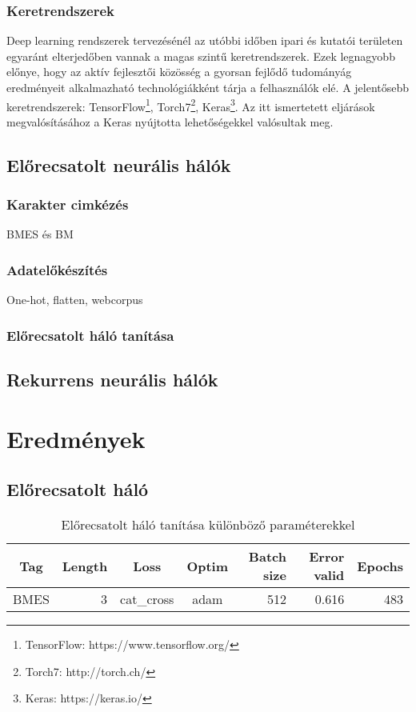 \documentclass[a4paper, magyar]{article}
\begin{document}
\subsubsection{Keretrendszerek}
Deep learning rendszerek tervezésénél az utóbbi időben ipari és kutatói területen egyaránt elterjedőben vannak a magas szintű keretrendszerek. Ezek legnagyobb előnye, hogy az aktív fejlesztői közösség a gyorsan fejlődő tudományág eredményeit alkalmazható technológiákként tárja a felhasználók elé. A jelentősebb keretrendszerek: TensorFlow\footnote{TensorFlow: https://www.tensorflow.org/}, Torch7\footnote{Torch7: http://torch.ch/}, Keras\footnote{Keras: https://keras.io/}. Az itt ismertetett eljárások megvalósításához a Keras nyújtotta lehetőségekkel valósultak meg\cite{chollet2015keras}. 
\subsection{Előrecsatolt neurális hálók}
\subsubsection{Karakter cimkézés}
BMES és BM
\subsubsection{Adatelőkészítés}
One-hot, flatten, webcorpus
\subsubsection{Előrecsatolt háló tanítása}
\subsection{Rekurrens neurális hálók}
\section{Eredmények}
\subsection{Előrecsatolt háló}
\begin{table}[h]\centering
	\begin{tabular}{|c|r|c|c|r|r|r|}
		\hline
		Tag&Length&Loss&Optim&Batch size&Error valid&Epochs\\
		\hline
		BMES&3&cat\_cross&adam&512&0.616&483\\ 
		\hline
	\end{tabular}
	\caption{Előrecsatolt háló tanítása különböző paraméterekkel}
\end{table}


\end{document}
